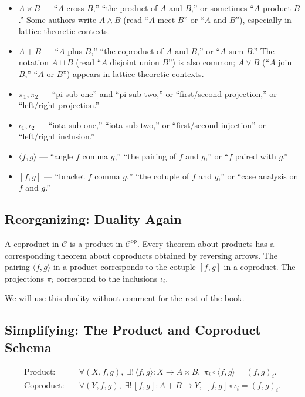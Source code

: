 \begin{howtosay}
\begin{itemize}
  \item $A \times B$ — ``$A$ cross $B$,'' ``the product of $A$ and $B$,''
        or sometimes ``$A$ product $B$.'' Some authors write $A \wedge B$
        (read ``$A$ meet $B$'' or ``$A$ and $B$''), especially in
        lattice-theoretic contexts.
  \item $A + B$ — ``$A$ plus $B$,'' ``the coproduct of $A$ and $B$,'' or
        ``$A$ sum $B$.'' The notation $A \sqcup B$ (read ``$A$ disjoint
        union $B$'') is also common; $A \vee B$ (``$A$ join $B$,'' ``$A$ or
        $B$'') appears in lattice-theoretic contexts.
  \item $\pi_1, \pi_2$ — ``pi sub one'' and ``pi sub two,'' or
        ``first/second projection,'' or ``left/right projection.''
  \item $\iota_1, \iota_2$ — ``iota sub one,'' ``iota sub two,'' or
        ``first/second injection'' or ``left/right inclusion.''
  \item $\langle f, g \rangle$ — ``angle $f$ comma $g$,'' ``the pairing of
        $f$ and $g$,'' or ``$f$ paired with $g$.''
  \item $[f, g]$ — ``bracket $f$ comma $g$,'' ``the cotuple of $f$ and
        $g$,'' or ``case analysis on $f$ and $g$.''
\end{itemize}
\end{howtosay}

\subsection{Reorganizing: Duality Again}

A coproduct in $\mathcal{C}$ is a product in $\mathcal{C}^{\mathrm{op}}$.
Every theorem about products has a corresponding theorem about coproducts
obtained by reversing arrows. The pairing $\langle f, g \rangle$ in a
product corresponds to the cotuple $[f, g]$ in a coproduct. The projections
$\pi_i$ correspond to the inclusions $\iota_i$.

We will use this duality without comment for the rest of the book.

\subsection{Simplifying: The Product and Coproduct Schema}

\begin{align*}
  \text{Product:}\quad
    &\forall (X, f, g),\; \exists !\, \langle f, g \rangle : X \to A \times B,\;
    \pi_i \circ \langle f, g \rangle = (f, g)_i. \\
  \text{Coproduct:}\quad
    &\forall (Y, f, g),\; \exists !\, [f, g] : A + B \to Y,\;
    [f, g] \circ \iota_i = (f, g)_i.
\end{align*}

